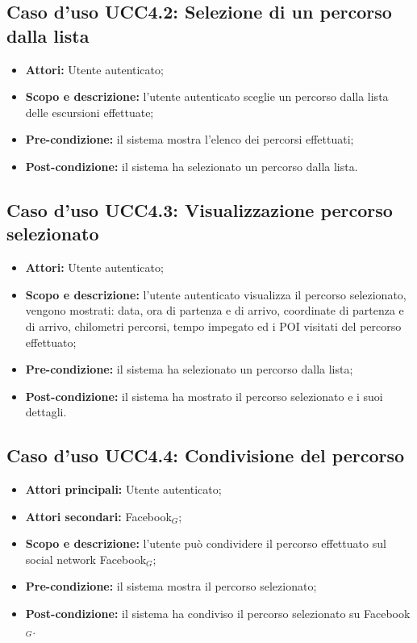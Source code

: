 \subsection{Caso d'uso UCC4.2: Selezione di un percorso dalla lista}

\begin{itemize}
\item \textbf{Attori:} Utente autenticato;
\item \textbf{Scopo e descrizione:} l'utente autenticato sceglie un percorso dalla lista delle escursioni effettuate;
\item \textbf{Pre-condizione:} il sistema mostra l'elenco dei percorsi effettuati;
\item \textbf{Post-condizione:} il sistema ha selezionato un percorso dalla lista.
\end{itemize}

\subsection{Caso d'uso UCC4.3: Visualizzazione percorso selezionato}

\begin{itemize}
\item \textbf{Attori:} Utente autenticato;
\item \textbf{Scopo e descrizione:} l'utente autenticato visualizza il percorso selezionato, vengono mostrati: data, ora di partenza e di arrivo, coordinate di partenza e di arrivo, chilometri percorsi, tempo impegato ed i POI visitati del percorso effettuato;
\item \textbf{Pre-condizione:} il sistema ha selezionato un percorso dalla lista;
\item \textbf{Post-condizione:} il sistema ha mostrato il percorso selezionato e i suoi dettagli.
\end{itemize}

\subsection{Caso d'uso UCC4.4: Condivisione del percorso}

\begin{itemize}
\item \textbf{Attori principali:} Utente autenticato;
\item \textbf{Attori secondari:} Facebook$_{G}$;
\item \textbf{Scopo e descrizione:} l'utente può condividere il percorso effettuato sul social network Facebook$_{G}$;
\item \textbf{Pre-condizione:} il sistema mostra il percorso selezionato;
\item \textbf{Post-condizione:} il sistema ha condiviso il percorso selezionato su Facebook$_{G}$. 
\end{itemize}

